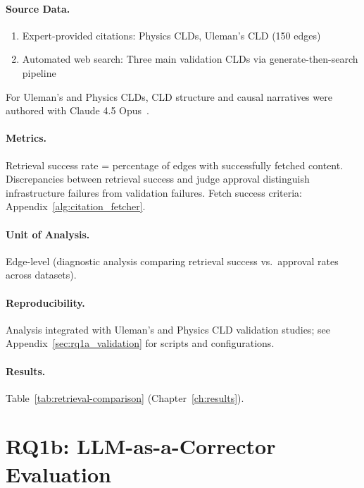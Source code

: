 \paragraph{Source Data.}
\begin{enumerate}[noitemsep]
    \item Expert-provided citations: Physics CLDs, Uleman's CLD (150 edges)
    \item Automated web search: Three main validation CLDs via generate-then-search pipeline
\end{enumerate}
For Uleman's and Physics CLDs, CLD structure and causal narratives were authored with Claude 4.5 Opus~\cite{anthropic2025claude45opus}.

\paragraph{Metrics.}
Retrieval success rate = percentage of edges with successfully fetched content. Discrepancies between retrieval success and judge approval distinguish infrastructure failures from validation failures. Fetch success criteria: Appendix~\ref{alg:citation_fetcher}.

\paragraph{Unit of Analysis.}
Edge-level (diagnostic analysis comparing retrieval success vs.\ approval rates across datasets).

\paragraph{Reproducibility.}
Analysis integrated with Uleman's and Physics CLD validation studies; see Appendix~\ref{sec:rq1a_validation} for scripts and configurations.

\paragraph{Results.}
Table~\ref{tab:retrieval-comparison} (Chapter~\ref{ch:results}).

\section{RQ1b: LLM-as-a-Corrector Evaluation}
\label{sec:rq1b}
\label{sec:rq1b_experiments}

